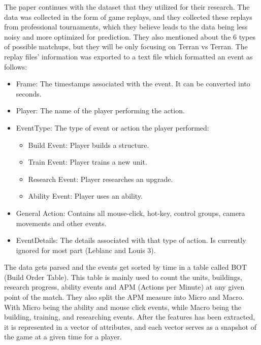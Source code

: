 \documentclass[a4paper,12pt]{report}
\begin{document}
The paper continues with the dataset that they utilized for their research. The data was collected in the form of game replays, and they collected these replays from professional tournaments, which they believe leads to the data being less noisy and more optimized for prediction. They also mentioned about the 6 types of possible matchups, but they will be only focusing on Terran vs Terran. The replay files’ information was exported to a text file which formatted an event as follows:

\begin{itemize}[,]
    \setlength\itemsep{-.1cm}
    \item Frame: The timestamps associated with the event. It can be converted into seconds.
    \item Player: The name of the player performing the action.
    \item EventType: The type of event or action the player performed:
    \vspace*{-2mm}
    \begin{itemize}[,]
        \setlength\itemsep{0cm}
        \item Build Event: Player builds a structure.
        \item Train Event: Player trains a new unit.
        \item Research Event: Player researches an upgrade.
        \item Ability Event: Player uses an ability.
    \end{itemize}
    \item General Action: Contains all mouse-click, hot-key, control groups, camera movements and other events.
    \item EventDetails: The details associated with that type of action. Is currently ignored for most part (Leblanc and Louis 3).
\end{itemize}

The data gets parsed and the events get sorted by time in a table called BOT (Build Order Table). This table is mainly used to count the units, buildings, research progress, ability events and APM (Actions per Minute) at any given point of the match. They also split the APM measure into Micro and Macro. With Micro being the ability and mouse click events, while Macro being the building, training, and researching events. After the features has been extracted, it is represented in a vector of attributes, and each vector serves as a snapshot of the game at a given time for a player.
\end{document}
